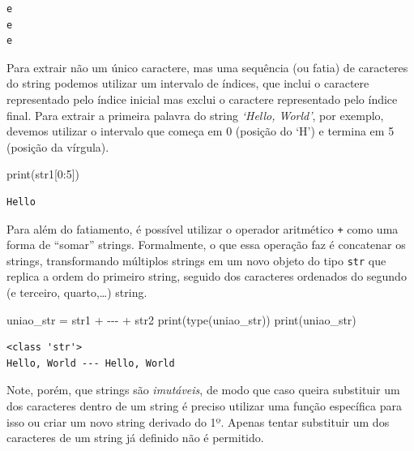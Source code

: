 \documentclass[
  brazilian,
  letterpaper,
  DIV=11,
  numbers=noendperiod]{scrreprt}
\newenvironment{Shaded}{\begin{snugshade}}{\end{snugshade}}
\newcommand{\BuiltInTok}[1]{\textcolor[rgb]{0.00,0.23,0.31}{#1}}
\newcommand{\DecValTok}[1]{\textcolor[rgb]{0.68,0.00,0.00}{#1}}
\newcommand{\NormalTok}[1]{\textcolor[rgb]{0.00,0.23,0.31}{#1}}
\newcommand{\OperatorTok}[1]{\textcolor[rgb]{0.37,0.37,0.37}{#1}}
\newcommand{\StringTok}[1]{\textcolor[rgb]{0.13,0.47,0.30}{#1}}
\begin{document}
\begin{verbatim}
e
e
e
\end{verbatim}

Para extrair não um único caractere, mas uma sequência (ou fatia) de
caracteres do string podemos utilizar um intervalo de índices, que
inclui o caractere representado pelo índice inicial mas exclui o
caractere representado pelo índice final. Para extrair a primeira
palavra do string \emph{`Hello, World'}, por exemplo, devemos utilizar o
intervalo que começa em 0 (posição do `H') e termina em 5 (posição da
vírgula).

\begin{Shaded}
\begin{Highlighting}[]
\BuiltInTok{print}\NormalTok{(str1[}\DecValTok{0}\NormalTok{:}\DecValTok{5}\NormalTok{])}
\end{Highlighting}
\end{Shaded}

\begin{verbatim}
Hello
\end{verbatim}

Para além do fatiamento, é possível utilizar o operador aritmético
\texttt{+} como uma forma de ``somar'' strings. Formalmente, o que essa
operação faz é concatenar os strings, transformando múltiplos strings em
um novo objeto do tipo \texttt{str} que replica a ordem do primeiro
string, seguido dos caracteres ordenados do segundo (e terceiro,
quarto,\ldots) string.

\begin{Shaded}
\begin{Highlighting}[]
\NormalTok{uniao\_str }\OperatorTok{=}\NormalTok{ str1 }\OperatorTok{+} \StringTok{\textquotesingle{} {-}{-}{-} \textquotesingle{}} \OperatorTok{+}\NormalTok{ str2}
\BuiltInTok{print}\NormalTok{(}\BuiltInTok{type}\NormalTok{(uniao\_str))}
\BuiltInTok{print}\NormalTok{(uniao\_str)}
\end{Highlighting}
\end{Shaded}

\begin{verbatim}
<class 'str'>
Hello, World --- Hello, World
\end{verbatim}

Note, porém, que strings são \emph{imutáveis}, de modo que caso queira
substituir um dos caracteres dentro de um string é preciso utilizar uma
função específica para isso ou criar um novo string derivado do 1º.
Apenas tentar substituir um dos caracteres de um string já definido não
é permitido.
\end{document}
